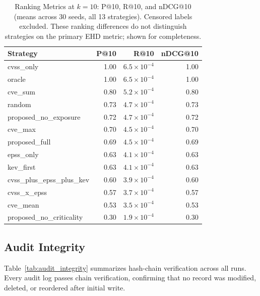 \documentclass[journal]{IEEEtran}
\begin{document}
\begin{table}[t]
\caption{Ranking Metrics at $k=10$: P@10, R@10, and nDCG@10
         (means across 30 seeds, all 13 strategies). Censored
         labels excluded. These ranking differences do not
         distinguish strategies on the primary EHD metric;
         shown for completeness.}
\label{tab:ranking_metrics}
\centering
\footnotesize
\setlength{\tabcolsep}{6pt}
\begin{tabular}{@{}lrrr@{}}
\toprule
\textbf{Strategy} & \textbf{P@10} & \textbf{R@10} &
  \textbf{nDCG@10} \\
\midrule
cvss\_only               & 1.00 & $6.5\times10^{-4}$ & 1.00 \\
oracle                   & 1.00 & $6.5\times10^{-4}$ & 1.00 \\
cve\_sum                 & 0.80 & $5.2\times10^{-4}$ & 0.80 \\
random                   & 0.73 & $4.7\times10^{-4}$ & 0.73 \\
proposed\_no\_exposure   & 0.72 & $4.7\times10^{-4}$ & 0.72 \\
cve\_max                 & 0.70 & $4.5\times10^{-4}$ & 0.70 \\
proposed\_full           & 0.69 & $4.5\times10^{-4}$ & 0.69 \\
epss\_only               & 0.63 & $4.1\times10^{-4}$ & 0.63 \\
kev\_first               & 0.63 & $4.1\times10^{-4}$ & 0.63 \\
cvss\_plus\_epss\_plus\_kev & 0.60 & $3.9\times10^{-4}$ & 0.60 \\
cvss\_x\_epss            & 0.57 & $3.7\times10^{-4}$ & 0.57 \\
cve\_mean                & 0.53 & $3.5\times10^{-4}$ & 0.53 \\
proposed\_no\_criticality & 0.30 & $1.9\times10^{-4}$ & 0.30 \\
\bottomrule
\end{tabular}
\end{table}

\subsection{Audit Integrity}

Table~\ref{tab:audit_integrity} summarizes hash-chain verification
across all runs.  Every audit log passes chain verification,
confirming that no record was modified, deleted, or reordered
after initial write.
\end{document}
